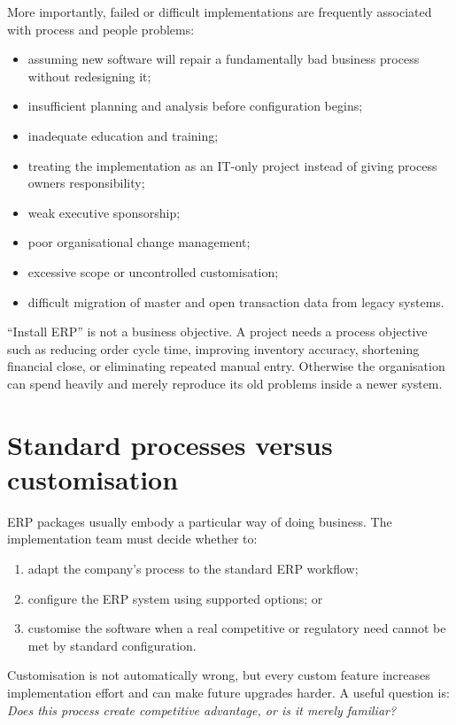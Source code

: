 More importantly, failed or difficult implementations are frequently associated with process and people problems:

\begin{itemize}
  \item assuming new software will repair a fundamentally bad business process without redesigning it;
  \item insufficient planning and analysis before configuration begins;
  \item inadequate education and training;
  \item treating the implementation as an IT-only project instead of giving process owners responsibility;
  \item weak executive sponsorship;
  \item poor organisational change management;
  \item excessive scope or uncontrolled customisation;
  \item difficult migration of master and open transaction data from legacy systems.
\end{itemize}

\begin{pitfall}
``Install ERP'' is not a business objective. A project needs a process objective such as reducing order cycle time, improving inventory accuracy, shortening financial close, or eliminating repeated manual entry. Otherwise the organisation can spend heavily and merely reproduce its old problems inside a newer system.
\end{pitfall}

\section{Standard processes versus customisation}

ERP packages usually embody a particular way of doing business. The implementation team must decide whether to:

\begin{enumerate}
  \item adapt the company's process to the standard ERP workflow;
  \item configure the ERP system using supported options; or
  \item customise the software when a real competitive or regulatory need cannot be met by standard configuration.
\end{enumerate}

Customisation is not automatically wrong, but every custom feature increases implementation effort and can make future upgrades harder. A useful question is: \emph{Does this process create competitive advantage, or is it merely familiar?}

